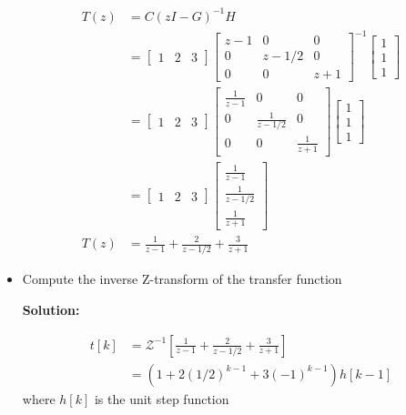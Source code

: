 \documentclass[twoside]{article}
\begin{document}
\begin{itemize}
\begin{align*}
  T(z) &= C \left( z I - G \right)^{-1} H \\
         &= \left[ \begin{array}{ccc} 1 & 2 & 3 \end{array} \right] 
\left[ \begin{array}{ccc} z-1 & 0 & 0\\ 0 & z-1/2 & 0
    \\ 0 & 0 & z+1 \end{array} \right]^{-1}           
\left[ \begin{array}{c} 1 \\ 1 \\ 1\end{array} \right]
\\
&= \left[ \begin{array}{ccc} 1 & 2 & 3 \end{array} \right] 
\left[ \begin{array}{ccc} \frac{1}{z-1} & 0 & 0\\ 0 & \frac{1}{z-1/2} & 0
    \\ 0 & 0 & \frac{1}{z+1} \end{array} \right]           
\left[ \begin{array}{c} 1 \\ 1 \\ 1\end{array} \right]                                   
\\
&= 
\left[ \begin{array}{ccc} 1 & 2 & 3 \end{array} \right] 
\left[ \begin{array}{c} \frac{1}{z-1} \\ \frac{1}{z-1/2} \\
         \frac{1}{z+1}\end{array} \right]         
\\
  T(z) &= \frac{1}{z-1} + \frac{2}{z-1/2} + \frac{3}{z+1}
\end{align*}    

\item Compute the inverse Z-transform of the  transfer function 

\textbf{Solution:}

\begin{align*}
  t[k] &= \mathcal{Z}^{-1} \left[ \frac{1}{z-1} + \frac{2}{z-1/2} +
  \frac{3}{z+1} \right]
\\
&= \left( 1 + 2 (1/2)^{k-1} + 3 (-1)^{k-1} \right) h[k-1]
\end{align*}    
%
where $h[k]$ is the unit step function


\end{itemize}

\end{document}
